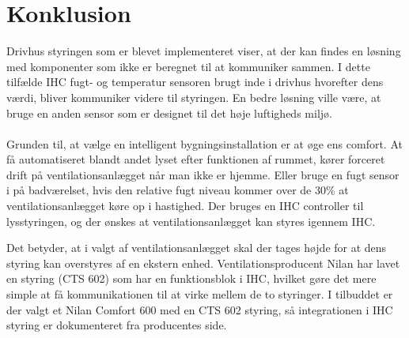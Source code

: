 \section{Konklusion}
Drivhus styringen som er blevet implementeret viser, 
at der kan findes en løsning med komponenter som ikke er beregnet til at kommuniker sammen.
I dette tilfælde IHC fugt- og temperatur sensoren brugt inde i drivhus hvorefter dens værdi,
bliver kommuniker videre til styringen. En bedre løsning ville være, at bruge en anden sensor
som er designet til det høje luftigheds miljø. 
\\ \\
Grunden til, at vælge en intelligent bygningsinstallation er at øge ens comfort. 
At få automatiseret blandt andet lyset efter funktionen af rummet, kører forceret drift på ventilationsanlægget
når man ikke er hjemme. 
Eller bruge en fugt sensor i på badværelset, hvis den relative fugt niveau kommer over de 30\% at ventilationsanlægget køre op i hastighed.
Der bruges en IHC controller til lysstyringen, og der ønskes at ventilationsanlægget kan styres igennem IHC.

Det betyder, at i valgt af ventilationsanlægget skal der tages højde for at dens styring kan overstyres af en ekstern enhed.
Ventilationsproducent Nilan har lavet en styring (CTS 602) som har en funktionsblok i IHC, 
hvilket gøre det mere simple at få kommunikationen til at virke mellem de to styringer.
I tilbuddet er der valgt et Nilan Comfort 600 med en CTS 602 styring, så integrationen i IHC styring er dokumenteret fra producentes side.


